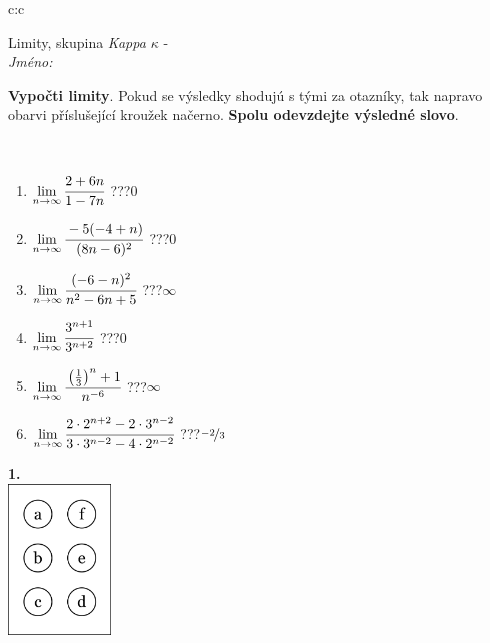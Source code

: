 \documentclass[10pt]{report}
\begin{document}
\begin{tabular}{c:c}
\begin{minipage}[c][104.5mm][t]{0.5\linewidth}
\begin{center}
\vspace{7mm}
{\huge Limity, skupina \textit{Kappa $\kappa$} -}\\[5mm]
\textit{Jméno:}\phantom{xxxxxxxxxxxxxxxxxxxxxxxxxxxxxxxxxxxxxxxxxxxxxxxxxxxxxxxxxxxxxxxxx}\\[5mm]
\begin{minipage}{0.95\linewidth}
\begin{center}
\textbf{Vypočti limity}. Pokud se výsledky shodujú s tými za otazníky, tak napravo\\obarvi příslušející kroužek načerno. \textbf{Spolu odevzdejte výsledné slovo}.
\end{center}
\end{minipage}
\\[1mm]
\begin{minipage}{0.79\linewidth}
\begin{center}
\begin{varwidth}{\linewidth}
\begin{enumerate}
\normalsize
\item $\lim\limits_{n\to\infty}\cfrac{2+6n}{1-7n}$\quad \dotfill\; ???\;\dotfill \quad $0$
\item $\lim\limits_{n\to\infty}\cfrac{-5(-4+n)}{(8n-6)^2}$\quad \dotfill\; ???\;\dotfill \quad $0$
\item $\lim\limits_{n\to\infty}\cfrac{(-6-n)^2}{n^2-6n+5}$\quad \dotfill\; ???\;\dotfill \quad $\infty$
\item $\lim\limits_{n\to\infty}\cfrac{3^{n+1}}{3^{n+2}}$\quad \dotfill\; ???\;\dotfill \quad $0$
\item $\lim\limits_{n\to\infty}\cfrac{\left(\frac{1}{3}\right)^n +1}{n^{-6}}$\quad \dotfill\; ???\;\dotfill \quad $\infty$
\item $\lim\limits_{n\to\infty}\cfrac{2\cdot 2^{n+2}-2\cdot 3^{n-2}}{3\cdot 3^{n-2}-4\cdot 2^{n-2}}$\quad \dotfill\; ???\;\dotfill \quad $\nicefrac{-2}{3}$
\end{enumerate}
\end{varwidth}
\end{center}
\end{minipage}
\begin{minipage}{0.20\linewidth}
\begin{center}
{\Huge\bfseries 1.} \\[2mm]
\includegraphics[height=40mm]{../images/braille.png}

\end{center}
\end{minipage}
\end{center}
\end{minipage}
\end{tabular}
\end{document}
